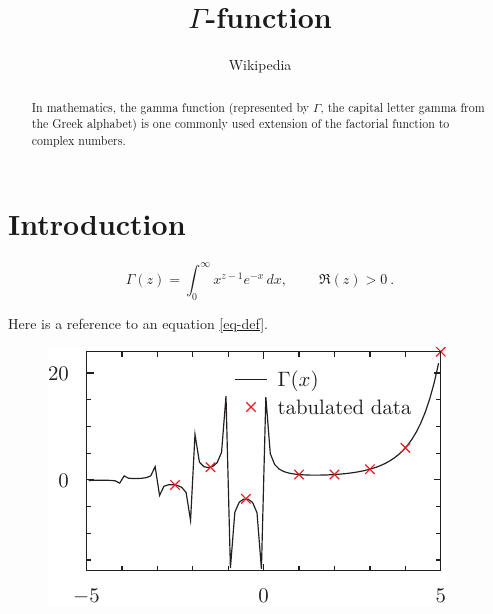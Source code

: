 \documentclass[twocolumn, a4paper]{article}
\begin{document}
\title{$\Gamma$-function}
\author{Wikipedia}
\maketitle
\begin{abstract}
In mathematics, the gamma function (represented by $\Gamma$, the capital letter gamma from the Greek alphabet) is one commonly used extension of the factorial function to complex numbers.
\end{abstract}
\section{Introduction}
\begin{equation}\label{eq-def}
	\Gamma(z) = \int_0^\infty x^{z-1} e^{-x}\,dx, \ \qquad \Re(z) > 0\ .
\end{equation}

Here is a reference to an equation \eqref{eq-def}.

\begin{figure} [b]
	\includegraphics{gamma_pyx.pdf}
\end{figure}
\end{document}
